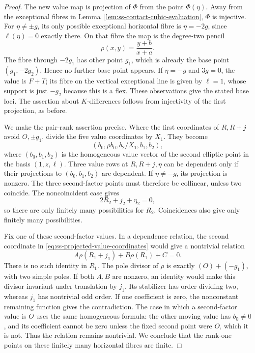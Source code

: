 \begin{proof}
The new value map is projection of $\Phi$ from the point
$\Phi(\eta)$. Away from the exceptional fibres in
Lemma~\ref{lem:ss-contact-cubic-evaluation}, $\Phi$ is injective.
For $\eta\ne\pm g$, its only possible exceptional horizontal
fibre is $\eta=-2g$, since $\ell(\eta)=0$ exactly there.
On that fibre the map is the degree-two pencil
\[
                         \rho(x,y)=\frac{y+b}{x+a}.
\]
The fibre through $-2g_1$ has other point $g_1$, which is already
the base point $(g_1,-2g_2)$. Hence no further base point appears.
If $\eta=-g$ and $3g=0$, the value is $F+T$; its fibre on the
vertical exceptional line is given by $\ell=1$, whose support
is just $-g_2$ because this is a flex. These observations give
the stated base loci. The assertion about $K$-differences follows
from injectivity of the first projection, as before.

We make the pair-rank assertion precise. Where the first coordinates
of $R,R+j$ avoid $O,\pm g_1$, divide the five value coordinates
by $X_1$. They become
\begin{equation}\label{eq:ss-projected-value-coordinates}
              (b_0,\rho b_0,b_2/X_1,b_1,b_2),
\end{equation}
where $(b_0,b_1,b_2)$ is the homogeneous value vector of the
second elliptic point in the basis $(1,z,\ell)$.
Three value rows at $R,R+j,\eta$ can be dependent only if their
projections to $(b_0,b_1,b_2)$ are dependent. If
$\eta\ne-g$, its projection is nonzero. The three second-factor
points must therefore be collinear, unless two coincide. The
noncoincident case gives
\[
                            2R_2+j_2+\eta_2=0,
\]
so there are only finitely many possibilities for $R_2$.
Coincidences also give only finitely many possibilities.

Fix one of these second-factor values. In a dependence relation,
the second coordinate in
\eqref{eq:ss-projected-value-coordinates} would give a
nontrivial relation
\[
                  A\rho(R_1+j_1)+B\rho(R_1)+C=0.
\]
There is no such identity in $R_1$. The pole divisor of $\rho$
is exactly $(O)+(-g_1)$, with two simple poles. If both $A,B$
are nonzero, an identity would make this divisor invariant under
translation by $j_1$. Its stabilizer has order dividing two,
whereas $j_1$ has nontrivial odd order. If one coefficient is zero,
the nonconstant remaining function gives the contradiction.
The case in which a second-factor value is $O$ uses the same
homogeneous formula: the other moving value has $b_0\ne0$, and
its coefficient cannot be zero unless the fixed second point
were $O$, which it is not. Thus the relation remains nontrivial.
We conclude that the rank-one points on these finitely many
horizontal fibres are finite.


\end{proof}
